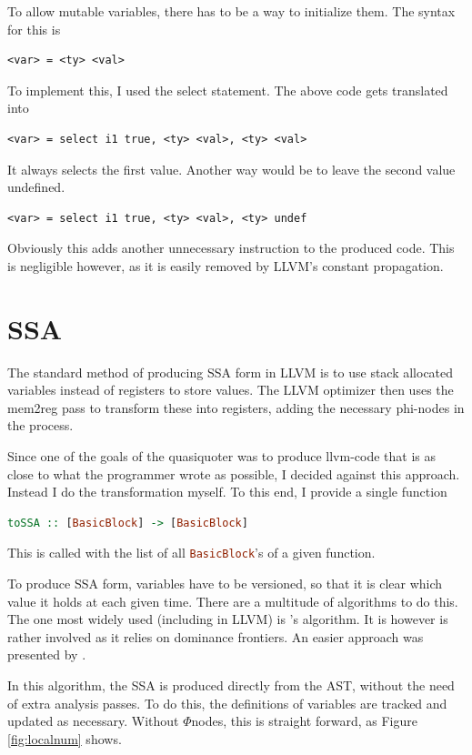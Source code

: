 \documentclass[a4paper,bibliography=totocnumbered,parskip,headsepline]{scrbook}
\begin{document}
To allow mutable variables, there has to be a way to initialize them.
The syntax for this is
\begin{lstlisting}[numbers=none]
 <var> = <ty> <val>
\end{lstlisting}
To implement this, I used the select statement.
The above code gets translated into
\begin{lstlisting}[numbers=none]
 <var> = select i1 true, <ty> <val>, <ty> <val>
\end{lstlisting}
It always selects the first value.
Another way would be to leave the second value undefined.
\begin{lstlisting}[numbers=none]
 <var> = select i1 true, <ty> <val>, <ty> undef
\end{lstlisting}
Obviously this adds another unnecessary instruction to the produced code.
This is negligible however, as it is easily removed by LLVM's constant propagation.

\section{SSA}
\label{sec:ssa}
The standard method of producing SSA form in LLVM is to use stack allocated variables instead of registers to store values.
The LLVM optimizer then uses the mem2reg pass to transform these into registers, adding the necessary phi-nodes in the process.

Since one of the goals of the quasiquoter was to produce llvm-code that is as close to what the programmer wrote as possible, I decided against this approach.
Instead I do the transformation myself.
To this end, I provide a single function

\begin{lstlisting}[language=haskell]
toSSA :: [BasicBlock] -> [BasicBlock]
\end{lstlisting}

This is called with the list of all \lstinline[language=haskell]!BasicBlock!'s of a given function.

To produce SSA form, variables have to be versioned, so that it is clear which value it holds at each given time.
There are a multitude of algorithms to do this.
The one most widely used (including in LLVM) is \citeauthor{cytron91efficiently}'s algorithm.
It is however is rather involved as it relies on dominance frontiers.
An easier approach was presented by \citeauthor{braun13simple}.

In this algorithm, the SSA is produced directly from the AST, without the need of extra analysis passes.
To do this, the definitions of variables are tracked and updated as necessary.
Without $\Phi$nodes, this is straight forward, as Figure \ref{fig:localnum} shows.
\end{document}

